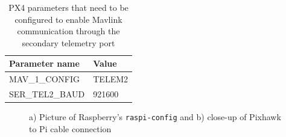\begin{table}[h!]
 \begin{center}
  \begin{tabular}{l|l}
    Parameter name & Value \\ \hline
    MAV\_1\_CONFIG & TELEM2 \\
    SER\_TEL2\_BAUD & 921600 \\
  \end{tabular}
  \caption{PX4 parameters that need to be configured to enable Mavlink communication through the secondary telemetry port}
  \label{tab:telem2-params}
 \end{center}
\end{table}


\begin{figure}
  \centering
  \caption{a) Picture of Raspberry's \texttt{raspi-config} and b) close-up of Pixhawk to Pi cable connection}
  \label{fig:serial-connection}
\end{figure}

